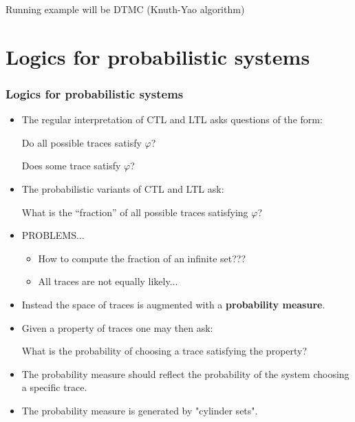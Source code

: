 \documentclass[handout]{beamer}
\begin{document}
\begin{frame}
Running example will be DTMC (Knuth-Yao algorithm)
\end{frame}

\section{Logics for probabilistic systems}
\begin{frame}
\frametitle{Logics for probabilistic systems}
\begin{itemize}
\item The regular interpretation of CTL and LTL asks questions of the form:\vspace{5mm}
\begin{displayquote}
Do all possible traces satisfy \(\varphi\)?
\end{displayquote}
\begin{displayquote}
Does some trace satisfy \(\varphi\)?
\end{displayquote}
\item The probabilistic variants of CTL and LTL ask:\vspace{5mm}
\begin{displayquote}
What is the ``fraction'' of all possible traces satisfying \( \varphi \)?
\end{displayquote}
\item PROBLEMS...
\begin{itemize}
\item How to compute the fraction of an infinite set???
\item All traces are not equally likely...
\end{itemize}
\end{itemize}
\end{frame}

\begin{frame}
\begin{itemize}
\item Instead the space of traces is augmented with a \textbf{probability measure}.
\item Given a property of traces one may then ask:\vspace{5mm}
\begin{displayquote}
What is the probability of choosing a trace satisfying the property?
\end{displayquote}
\item The probability measure should reflect the probability of the system choosing a specific trace.
\item The probability measure is generated by "cylinder sets".

\end{itemize}
\end{frame}
\end{document}
